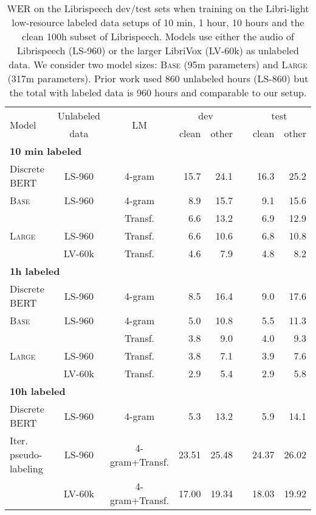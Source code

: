 \documentclass{article}
\newcommand{\wvppbase}{\textsc{Base}}
\newcommand{\wvppbig}{\textsc{Large}}
\newcommand{\vox}{LibriVox}
\newcommand{\libri}{Librispeech}
\newcommand{\libril}{Libri-light}
\newcommand{\voxsz}{LV-60k}
\newcommand{\librisz}{LS-960}
\begin{document}
\begin{table}[t]
\caption{WER on the \libri{} dev/test sets when training on the \libril{} low-resource labeled data setups of 10 min, 1 hour, 10 hours and the clean 100h subset of \libri{}. 
Models use either the audio of \libri{} (\librisz{}) or the larger \vox{} (\voxsz{}) as unlabeled data.
We consider two model sizes: \wvppbase{} (95m parameters) and \wvppbig{} (317m parameters).
Prior work used 860 unlabeled hours (LS-860) but the total with labeled data is 960 hours and comparable to our setup.
}
\label{tab:librilight}
\centering 
\begin{tabular}{lccrrrrr}
\toprule
\multirow{2}{*}{Model} & Unlabeled & \multirow{2}{*}{LM} & \multicolumn{2}{c}{dev} && \multicolumn{2}{c}{test} \\
\cline{4-5}\cline{7-8} 
{} & data & {} & clean & other && clean & other \\
\midrule
\midrule
\multicolumn{8}{l}{\textbf{10 min labeled}}\\
Discrete BERT~\citep{baevski2019effectiveness} & \librisz{} & 4-gram & 15.7 & 24.1 && 16.3 & 25.2 \\
\midrule
\wvppbase{} & \librisz{} & 4-gram & 8.9 & 15.7 && 9.1 & 15.6 \\
&& Transf. & 6.6 & 13.2 && 6.9 & 12.9 \\
\wvppbig{} & \librisz{} & Transf. & 6.6 & 10.6 && 6.8 & 10.8 \\
& \voxsz{} & Transf. & 4.6 & 7.9 && 4.8 & 8.2 \\
\midrule
\midrule
\multicolumn{8}{l}{\textbf{1h labeled}}\\
Discrete BERT~\citep{baevski2019effectiveness} & \librisz{} & 4-gram & 8.5 & 16.4 && 9.0 & 17.6 \\
\midrule
\wvppbase{} & \librisz{} & 4-gram & 5.0 & 10.8 && 5.5 & 11.3 \\
&& Transf. & 3.8 & 9.0 && 4.0 & 9.3 \\
\wvppbig{} & \librisz{} & Transf. & 3.8 & 7.1 && 3.9 & 7.6 \\
& \voxsz{} & Transf. & 2.9 & 5.4 && 2.9 & 5.8 \\
\midrule
\midrule
\multicolumn{8}{l}{\textbf{10h labeled}}\\
Discrete BERT~\citep{baevski2019effectiveness} & \librisz{} & 4-gram & 5.3 & 13.2 && 5.9 & 14.1 \\
Iter. pseudo-labeling~\cite{xu2020iterative} & \librisz{} & 4-gram+Transf. & 23.51 & 25.48 && 24.37 & 26.02 \\
{} & \voxsz{} & 4-gram+Transf. & 17.00 & 19.34 && 18.03 & 19.92 \\

\end{tabular}
\end{table}
\end{document}

